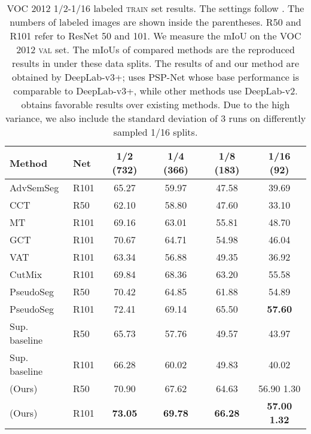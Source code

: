 \begin{table}[tb]
    \small
    \centering
    \caption{VOC 2012 1/2-1/16 labeled \textsc{train} set results. The settings follow \cite{zou2020pseudoseg}. The numbers of labeled images are shown inside the parentheses. R50 and R101 refer to ResNet 50 and 101. We measure the mIoU on the VOC 2012 \textsc{val} set. The mIoUs of compared methods are the reproduced results in \cite{zou2020pseudoseg} under these data splits. The results of \cite{zou2020pseudoseg,french2020semi} and our method are obtained by DeepLab-v3+; \cite{ouali2020semi} uses PSP-Net whose base performance is comparable to DeepLab-v3+, while other methods use DeepLab-v2. \ours{} obtains favorable results over existing methods. Due to the high variance, we also include the standard deviation of 3 runs on differently sampled 1/16 splits.} 
    \label{tab:voc1}
    \setlength{\tabcolsep}{0.9pt}
    \begin{tabular}{llcccc}
    \toprule
        Method    & Net & 1/2 (732) & 1/4 (366) & 1/8 (183) & 1/16 (92) \\
    \midrule
        AdvSemSeg \cite{hung2019adversarial}  & R101  & 65.27  & 59.97  & 47.58  & 39.69 \\
        CCT \cite{ouali2020semi}  & R50  & 62.10  & 58.80  & 47.60  & 33.10 \\
        MT \cite{tarvainen2017mean}  & R101  & 69.16  & 63.01  & 55.81  & 48.70 \\
        GCT \cite{ke2020guided}  & R101  & 70.67  & 64.71  & 54.98  & 46.04  \\
        VAT \cite{miyato2018virtual}  & R101  & 63.34  & 56.88  & 49.35  & 36.92  \\
        CutMix \cite{french2020semi}  & R101  & 69.84  & 68.36  & 63.20  & 55.58  \\
        PseudoSeg \cite{zou2020pseudoseg} & R50  & 70.42  & 64.85  & 61.88  & 54.89  \\
        PseudoSeg \cite{zou2020pseudoseg} & R101 & 72.41  & 69.14  & 65.50  & \textbf{57.60}  \\
    \midrule
        Sup. baseline  & R50  & 65.73  & 57.76  & 49.57  & 43.97 \\
        Sup. baseline  & R101 & 66.28  & 60.02  & 49.83  & 40.02 \\
        \ours{} (Ours) & R50  & 70.90  & 67.62  & 64.63  & 56.90 1.30 \\
        \ours{} (Ours) & R101 & \textbf{73.05}  & \textbf{69.78}  & \textbf{66.28}  & \textbf{57.00 1.32} \\
    \bottomrule
    \end{tabular}
\end{table}

